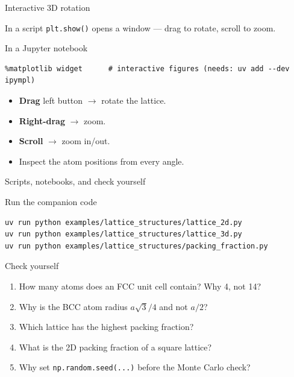 \documentclass[aspectratio=169]{beamer}
\begin{document}
\begin{frame}[fragile]{Interactive 3D rotation}
  \begin{block}{In a script}
    \texttt{plt.show()} opens a window --- drag to rotate, scroll to zoom.
  \end{block}
  \begin{block}{In a Jupyter notebook}
    \begin{lstlisting}
%matplotlib widget      # interactive figures (needs: uv add --dev ipympl)
    \end{lstlisting}
  \end{block}
  \begin{itemize}
    \item \textbf{Drag} left button $\rightarrow$ rotate the lattice.
    \item \textbf{Right-drag} $\rightarrow$ zoom.
    \item \textbf{Scroll} $\rightarrow$ zoom in/out.
    \item Inspect the atom positions from every angle.
  \end{itemize}
\end{frame}

\begin{frame}[fragile]{Scripts, notebooks, and check yourself}
  \begin{block}{Run the companion code}
    \begin{lstlisting}
uv run python examples/lattice_structures/lattice_2d.py
uv run python examples/lattice_structures/lattice_3d.py
uv run python examples/lattice_structures/packing_fraction.py
    \end{lstlisting}
  \end{block}
  \begin{block}{Check yourself}
    \begin{enumerate}
      \item How many atoms does an FCC unit cell contain? Why 4, not 14?
      \item Why is the BCC atom radius $a\sqrt{3}/4$ and not $a/2$?
      \item Which lattice has the highest packing fraction?
      \item What is the 2D packing fraction of a square lattice?
      \item Why set \texttt{np.random.seed(...)} before the Monte Carlo check?
    \end{enumerate}
  \end{block}
\end{frame}
\end{document}
